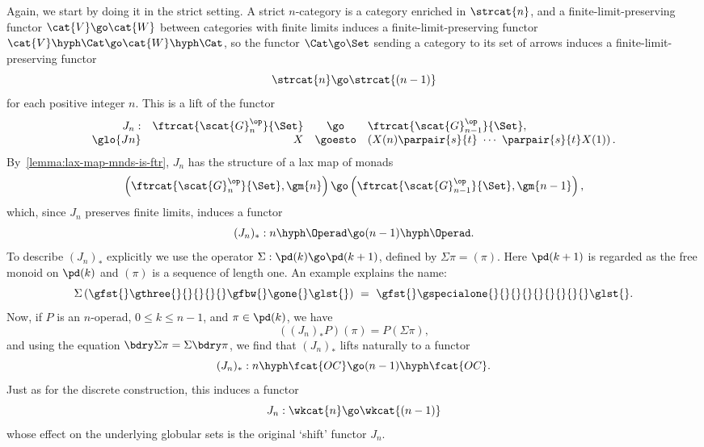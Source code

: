Again, we start by doing it in the strict%
%
%
setting.  A strict $n$-category
is a category enriched in $\strcat{n}$, and a finite-limit-preserving
functor $\cat{V} \go \cat{W}$ between categories with finite limits induces
a finite-limit-preserving functor $\cat{V}\hyph\Cat \go \cat{W}\hyph\Cat$,
so the functor $\Cat \go \Set$ sending a category to its set of arrows
induces a finite-limit-preserving functor
\[
\strcat{n} \go \strcat{(n-1)}
\]
for each positive integer $n$.  This is a lift of the functor
\[
\begin{array}{rrcl}
J_n:	&
\ftrcat{\scat{G}_n^\op}{\Set}		&
\go	&
\ftrcat{\scat{G}_{n-1}^\op}{\Set},	\\%
% 
\glo{Jn}
% 
	&
X	&
\goesto	&
\left(
X(n)
\parpair{s}{t}
\ 
\cdots
\ 
\parpair{s}{t}
X(1)
\right).
\end{array}
\]
By~\ref{lemma:lax-map-mnds-is-ftr}, $J_n$ has the structure of a lax map of
monads
\[
\left(
\ftrcat{\scat{G}_n^\op}{\Set}, \gm{n}
\right)
\go 
\left(
\ftrcat{\scat{G}_{n-1}^\op}{\Set}, \gm{n-1}
\right),
\]
which, since $J_n$ preserves finite limits, induces a functor
\[
(J_n)_*: 
n\hyph\Operad
\go
(n-1)\hyph\Operad.
\]
To describe $(J_n)_*$ explicitly we use the %
%
%
operator
$\Sigma: \pd(k) \go \pd(k+1)$,%
% 
% 
defined by $\Sigma\pi = (\pi)$.  Here
$\pd(k+1)$ is regarded as the free monoid on $\pd(k)$ and $(\pi)$ is a
sequence of length one.  An example explains the name:
\[
\Sigma
\left(
\gfst{}\gthree{}{}{}{}{}\gfbw{}\gone{}\glst{}
\right)
\ 
=
\ 
\gfst{}\gspecialone{}{}{}{}{}{}{}{}{}\glst{}.
\]
Now, if $P$ is an $n$-operad, $0\leq k\leq n-1$, and $\pi\in\pd(k)$, 
we have
\[
((J_n)_* P)(\pi) = P(\Sigma \pi),
\]
and using the equation $\bdry\Sigma\pi = \Sigma\bdry\pi$, we find that
$(J_n)_*$ lifts naturally to a functor
\[
(J_n)_*: 
n\hyph\fcat{OC} 
\go 
(n-1)\hyph\fcat{OC}.
\]
Just as for the discrete construction, this induces a functor
\[
J_n: \wkcat{n} \go \wkcat{(n-1)}
\]
whose effect on the underlying globular sets is the original `shift'
functor $J_n$.

